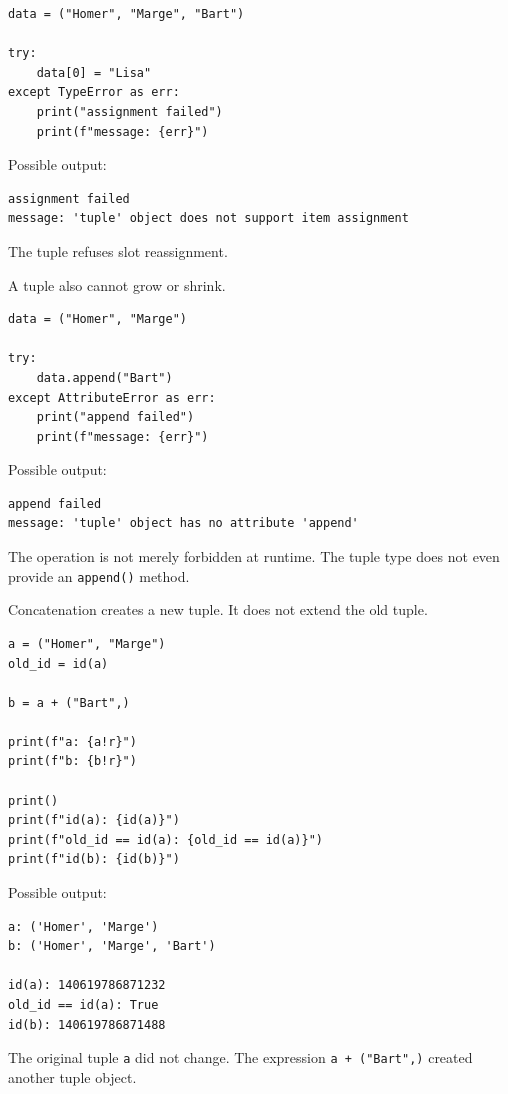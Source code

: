 \begin{verbatim}
data = ("Homer", "Marge", "Bart")

try:
    data[0] = "Lisa"
except TypeError as err:
    print("assignment failed")
    print(f"message: {err}")
\end{verbatim}

Possible output:

\begin{verbatim}
assignment failed
message: 'tuple' object does not support item assignment
\end{verbatim}

The tuple refuses slot reassignment.

A tuple also cannot grow or shrink.

\begin{verbatim}
data = ("Homer", "Marge")

try:
    data.append("Bart")
except AttributeError as err:
    print("append failed")
    print(f"message: {err}")
\end{verbatim}

Possible output:

\begin{verbatim}
append failed
message: 'tuple' object has no attribute 'append'
\end{verbatim}

The operation is not merely forbidden at runtime. The tuple type does not even provide an \texttt{append()} method.

Concatenation creates a new tuple. It does not extend the old tuple.

\begin{verbatim}
a = ("Homer", "Marge")
old_id = id(a)

b = a + ("Bart",)

print(f"a: {a!r}")
print(f"b: {b!r}")

print()
print(f"id(a): {id(a)}")
print(f"old_id == id(a): {old_id == id(a)}")
print(f"id(b): {id(b)}")
\end{verbatim}

Possible output:

\begin{verbatim}
a: ('Homer', 'Marge')
b: ('Homer', 'Marge', 'Bart')

id(a): 140619786871232
old_id == id(a): True
id(b): 140619786871488
\end{verbatim}

The original tuple \texttt{a} did not change. The expression \texttt{a + ("Bart",)} created another tuple object.

